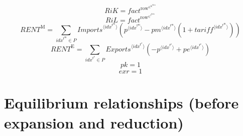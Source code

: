 \begin{equation}
{R\!i\!K} = {f\!a\!c\!t}^{\mathrm{row}^{\in^{\mathrm{k}^{\mathrm{data}}}}}
\end{equation}
\begin{equation}
{R\!i\!L} = {f\!a\!c\!t}^{\mathrm{row}^{\in^{\mathrm{l}^{\mathrm{data}}}}}
\end{equation}
\begin{equation}
{R\!E\!N\!T}^{\mathrm{M}} = \sum_{{i\!d\!x}^{\mathrm{r}^{\mathrm{m}}}\in P} {{{I\!m\!p\!o\!r\!t\!s}}^{\langle {i\!d\!x}^{\mathrm{r}^{\mathrm{m}}}\rangle}} \left({p}^{\langle {i\!d\!x}^{\mathrm{r}^{\mathrm{m}}}\rangle} - {{{p\!m}}^{\langle {i\!d\!x}^{\mathrm{r}^{\mathrm{m}}}\rangle}} \left(1 + {{t\!a\!r\!i\!f\!f}}^{\langle {i\!d\!x}^{\mathrm{r}^{\mathrm{m}}}\rangle}\right)\right)
\end{equation}
\begin{equation}
{R\!E\!N\!T}^{\mathrm{E}} = \sum_{{i\!d\!x}^{\mathrm{r}^{\mathrm{e}}}\in P} {{{E\!x\!p\!o\!r\!t\!s}}^{\langle {i\!d\!x}^{\mathrm{r}^{\mathrm{e}}}\rangle}} \left(-{p}^{\langle {i\!d\!x}^{\mathrm{r}^{\mathrm{e}}}\rangle} + {{p\!e}}^{\langle {i\!d\!x}^{\mathrm{r}^{\mathrm{e}}}\rangle}\right)
\end{equation}
\begin{equation}
{p\!k} = 1
\end{equation}
\begin{equation}
{e\!x\!r} = 1
\end{equation}




\section{Equilibrium relationships (before expansion and reduction)}

